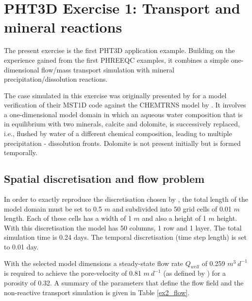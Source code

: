 \section[PHT3D Exercise 1: Transport and mineral reactions]{PHT3D Exercise 1: Transport and mineral reactions}

The present exercise is the first PHT3D application example. 
Building on the experience gained from the first PHREEQC examples, 
it combines a simple one-dimensional flow/mass transport simulation with
mineral precipitation/dissolution reactions.

The case simulated in this exercise was originally presented by
\cite{enges92} for a model verification of their MST1D code
against the CHEMTRNS model by \cite{noor87}. It involves a
one-dimensional model domain in which an aqueous water composition
that is in equilibrium with two minerals, calcite and dolomite, is
successively replaced, i.e., flushed by water of a different
chemical composition, leading to multiple
precipitation - dissolution fronts. Dolomite is not present
initially but is formed temporally.

\subsection[Spatial discretisation and flow problem]{Spatial discretisation and flow problem}

In order to exactly reproduce the discretisation chosen by \cite{enges92}, 
the total length of the model domain must be set to 0.5 $m$ and subdivided 
into 50 grid cells of 0.01 $m$ length. Each of these cells has a width of 1 $m$ and 
also a height of 1 $m$ height. With this discretisation the model
has 50 columns, 1 row and 1 layer. 
The total simulation time is 0.24 days. 
The temporal discretisation (time step length) is set to 0.01 day.

With the selected model dimensions a steady-state flow rate $Q_{well}$ 
of 0.259 $m^3\ d^{-1}$ is required to achieve the pore-velocity of 0.81 $m\
d^{-1}$ (as defined by \cite{enges92}) for a porosity of 0.32. A summary of the
parameters that define the flow field and the non-reactive transport
simulation is given in Table \ref{ex2_flow}.

